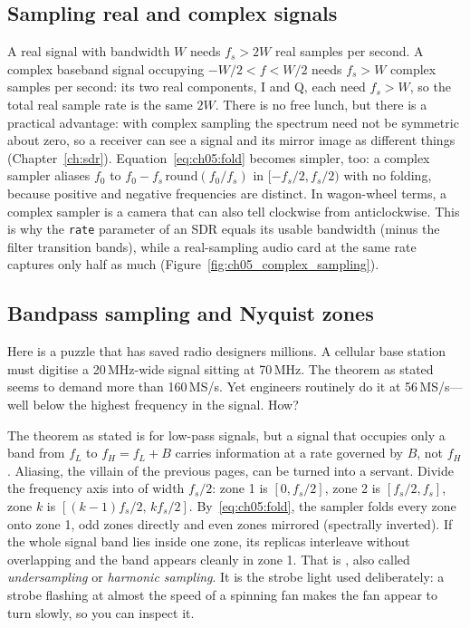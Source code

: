 \subsection{Sampling real and complex signals}

A real signal with bandwidth $W$ needs $f_s>2W$ real samples per second. A complex baseband
signal occupying $-W/2<f<W/2$ needs $f_s>W$ complex samples per second: its two real
components, I and Q, each need $f_s>W$, so the total real sample rate is the same $2W$. There
is no free lunch, but there is a practical advantage: with complex sampling the spectrum
need not be symmetric about zero, so a receiver can see a signal and its mirror image as
different things (Chapter~\ref{ch:sdr}). Equation~\eqref{eq:ch05:fold} becomes simpler, too:
a complex sampler aliases $f_0$ to $f_0-f_s\,\mathrm{round}(f_0/f_s)$ in $[-f_s/2,f_s/2)$ with no
folding, because positive and negative frequencies are distinct. In wagon-wheel terms, a complex
sampler is a camera that can also tell clockwise from anticlockwise. This is why the
\texttt{rate} parameter of an SDR equals its usable bandwidth (minus the filter transition
bands), while a real-sampling audio card at the same rate captures only half as much
(Figure~\ref{fig:ch05_complex_sampling}).

\subsection{Bandpass sampling and Nyquist zones}
\label{sec:ch05:bandpass}

Here is a puzzle that has saved radio designers millions. A cellular base station must digitise a
20\,MHz-wide signal sitting at 70\,MHz. The theorem as stated seems to demand more than 160\,MS/s.
Yet engineers routinely do it at 56\,MS/s---well below the highest frequency in the signal. How?


The theorem as stated is for low-pass signals, but a signal that occupies only a band from
$f_L$ to $f_H=f_L+B$ carries information at a rate governed by $B$, not $f_H$. Aliasing, the villain
of the previous pages, can be turned into a servant. Divide the frequency axis into  of width $f_s/2$: zone 1 is $[0,f_s/2]$, zone 2 is $[f_s/2,f_s]$, zone $k$ is
$[(k-1)f_s/2,\,kf_s/2]$. By~\eqref{eq:ch05:fold}, the sampler folds every zone onto zone 1, odd
zones directly and even zones mirrored (spectrally inverted). If the whole signal band lies inside
one zone, its replicas interleave without overlapping and the band appears cleanly in zone 1. That
is , also called \emph{undersampling} or \emph{harmonic sampling}. It is the
strobe light used deliberately: a strobe flashing at almost the speed of a spinning fan makes the
fan appear to turn slowly, so you can inspect it.

